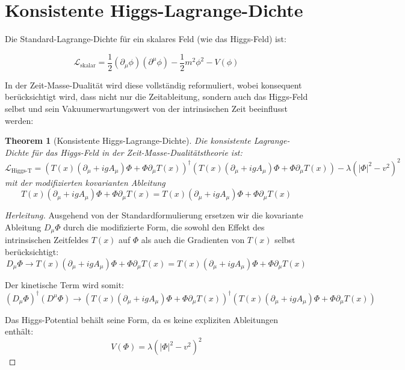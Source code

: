 \documentclass{article}
\newtheorem{theorem}{Theorem}[section]
\theoremstyle{definition}
\theoremstyle{remark}
\newcommand{\HiggsLagr}{\mathcal{L}_{\text{Higgs-T}}}
\newcommand{\Tfield}{T(x)} %
\newcommand{\DhiggsTdef}{\Tfield (\partial_\mu + igA_\mu)\Phi + \Phi \partial_\mu \Tfield}
\begin{document}
		\section{Konsistente Higgs-Lagrange-Dichte}
		
		Die Standard-Lagrange-Dichte für ein skalares Feld (wie das Higgs-Feld) ist:
		
		\begin{equation}
			\mathcal{L}_{\text{skalar}} = \frac{1}{2}(\partial_\mu \phi)(\partial^\mu \phi) - \frac{1}{2}m^2\phi^2 - V(\phi)
		\end{equation}
		
		In der Zeit-Masse-Dualität wird diese vollständig reformuliert, wobei konsequent berücksichtigt wird, dass nicht nur die Zeitableitung, sondern auch das Higgs-Feld selbst und sein Vakuumerwartungswert von der intrinsischen Zeit beeinflusst werden:
		
		\begin{theorem}[Konsistente Higgs-Lagrange-Dichte]
			Die konsistente Lagrange-Dichte für das Higgs-Feld in der Zeit-Masse-Dualitätstheorie ist:
			\begin{equation}
				\HiggsLagr = (\DhiggsTdef)^\dagger (\DhiggsTdef) - \lambda(|\Phi|^2 - v^2)^2
			\end{equation}
			mit der modifizierten kovarianten Ableitung
			\begin{equation}
				\DhiggsTdef = \Tfield (\partial_\mu + igA_\mu)\Phi + \Phi \partial_\mu \Tfield
			\end{equation}
		\end{theorem}
		
		\begin{proof}[Herleitung]
			Ausgehend von der Standardformulierung ersetzen wir die kovariante Ableitung $D_\mu \Phi$ durch die modifizierte Form, die sowohl den Effekt des intrinsischen Zeitfeldes $\Tfield$ auf $\Phi$ als auch die Gradienten von $\Tfield$ selbst berücksichtigt:
			\begin{equation}
				D_\mu \Phi \rightarrow \DhiggsTdef = \Tfield (\partial_\mu + igA_\mu)\Phi + \Phi \partial_\mu \Tfield
			\end{equation}
			
			Der kinetische Term wird somit:
			\begin{equation}
				(D_\mu \Phi)^\dagger (D^\mu \Phi) \rightarrow (\DhiggsTdef)^\dagger (\DhiggsTdef)
			\end{equation}
			
			Das Higgs-Potential behält seine Form, da es keine expliziten Ableitungen enthält:
			\begin{equation}
				V(\Phi) = \lambda(|\Phi|^2 - v^2)^2
			\end{equation}
		\end{proof}
		
\end{document}
